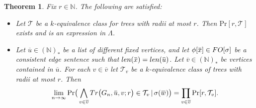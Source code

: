 \documentclass[12pt,notitlepage,a4paper]{article}
\newtheorem{theorem}{Theorem}[section]
\theoremstyle{definition}
\newcommand{\N}{\mathbb{N}}
\newcommand{\Ln}{\lim\limits_{n\to \infty}}
\newcommand{\overbar}[1]{\mkern 1.5mu\overline{\mkern-1.5mu#1\mkern-1.5mu}\mkern 1.5mu}
\begin{document}
\begin{theorem} \label{thm:BigTrees}
	Fix $r\in \N$. The following are satisfied:
	\begin{itemize}
		\item[(1)] Let $\mathcal{T}$ be a
		$k$-equivalence class for trees with radii at most $r$.
		Then $\mathrm{Pr}[r,\mathcal{T}]$ exists and is an expression
		in $\Lambda$.
		\item[(2)] Let $\overline{u}\in (\N)_*$ be a list of different fixed 
		vertices, and let $\phi[\overbar{x}]\in FO[\sigma]$ be a consistent
		edge sentence such that 
		$len(\overbar{x})=len(\overbar{u})$.
		Let $\overline{v}\in (\N)_*$ be vertices contained
		in $\overline{u}$. For each $v\in \overline{v}$
		let $\mathcal{T}_v$ be a $k$-equivalence class
		of trees with radii	at most $r$. Then
		\[
		\Ln \mathrm{Pr}\big( \bigwedge_{v\in \overline{v}} 
		Tr\big(G_n, \overbar{u},v;r\big)\in \mathcal{T}_v 
		\, | \, \sigma(\overbar{w})
		\big)= \prod_{v\in \overline{v}} \mathrm{Pr}[r,\mathcal{T}_v]. \]	 	
	\end{itemize}
\end{theorem}
\end{document}

